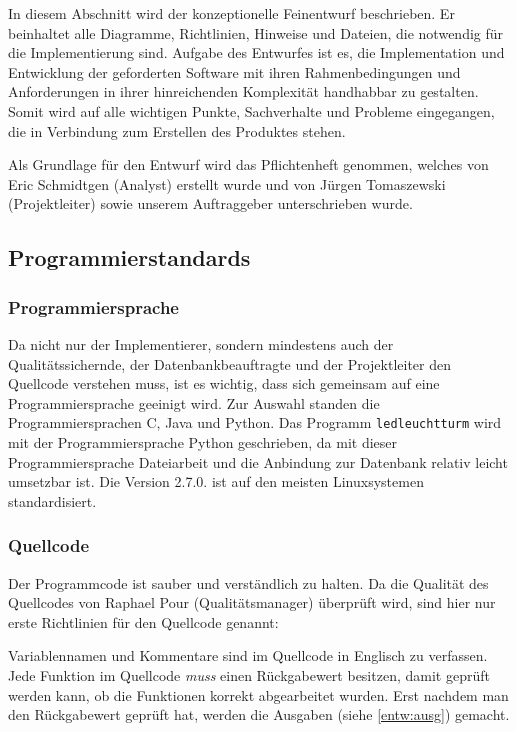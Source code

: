 	In diesem Abschnitt wird der konzeptionelle Feinentwurf beschrieben. Er beinhaltet alle Diagramme, Richtlinien, Hinweise und Dateien, die notwendig für die Implementierung sind. Aufgabe des Entwurfes ist es, die Implementation und Entwicklung der geforderten Software mit ihren Rahmenbedingungen und Anforderungen in ihrer hinreichenden Komplexität handhabbar zu gestalten. Somit wird auf alle wichtigen Punkte, Sachverhalte und Probleme eingegangen, die in Verbindung zum Erstellen des Produktes stehen.
	
	Als Grundlage für den Entwurf wird das Pflichtenheft genommen, welches von Eric Schmidtgen (Analyst) erstellt wurde und von Jürgen Tomaszewski (Projektleiter) sowie unserem Auftraggeber unterschrieben wurde. 
\subsection{Programmierstandards}	
\subsubsection{Programmiersprache}	
	Da nicht nur der Implementierer, sondern mindestens auch der Qualitätssichernde, der Datenbankbeauftragte und der Projektleiter den Quellcode verstehen muss, ist es wichtig, dass sich gemeinsam auf eine Programmiersprache geeinigt wird. Zur Auswahl standen die Programmiersprachen C, Java und Python. Das Programm \texttt{ledleuchtturm} wird mit der Programmiersprache Python geschrieben, da mit dieser Programmiersprache Dateiarbeit und die Anbindung zur Datenbank relativ leicht umsetzbar ist. Die Version 2.7.0. ist auf den meisten Linuxsystemen standardisiert. 
\subsubsection{Quellcode}
	Der Programmcode ist sauber und verständlich zu halten. Da die Qualität des Quellcodes von Raphael Pour (Qualitätsmanager) überprüft wird, sind hier nur erste Richtlinien für den Quellcode genannt:
	
	Variablennamen und Kommentare sind im Quellcode in Englisch zu verfassen. Jede Funktion im Quellcode \emph{muss} einen Rückgabewert besitzen, damit geprüft werden kann, ob die Funktionen korrekt abgearbeitet wurden. Erst nachdem man den Rückgabewert geprüft hat, werden die Ausgaben (siehe \autoref{entw:ausg}) gemacht.
	
